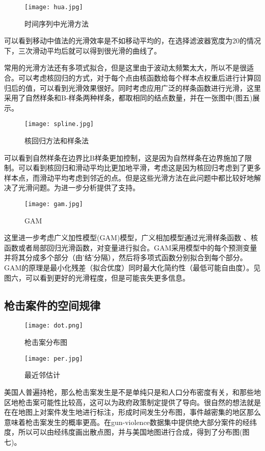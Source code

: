 \documentclass[12pt]{ctexart}
\begin{document}
\begin{figure}[!htb]
	\centering
	\texttt{[image: hua.jpg]} %
	\caption{时间序列中光滑方法} %
\end{figure}

可以看到移动中值法的光滑效率是不如移动平均的，在选择滤波器宽度为20的情况下，三次滑动平均后就可以得到很光滑的曲线了\cite{Tukey}。

常用的光滑方法还有多项式拟合，但是这里由于波动太频繁太大，所以不是很适合。可以考虑核回归的方式，对于每个点由核函数给每个样本点权重后进行计算回归后的值，可以看到光滑效果很好。同时考虑应用广泛的样条函数进行光滑，这里采用了自然样条和B-样条两种样条，都取相同的结点数量，并在一张图中(图五)展示。

\begin{figure}[!htb]
	\centering
	\texttt{[image: spline.jpg]} %
	\caption{核回归方法和样条法} %
\end{figure}
可以看到自然样条在边界比B样条更加控制，这是因为自然样条在边界施加了限制。可以看到核回归和滑动平均比更加地平滑，考虑这是因为核回归考虑到了更多样本点，而滑动平均考虑到邻近的点。但是这些光滑方法在此问题中都比较好地解决了光滑问题。为进一步分析提供了支持。
\begin{figure}[!htb]
	\centering
	\texttt{[image: gam.jpg]} %
	\caption{GAM} %
\end{figure}
这里进一步考虑广义加性模型(GAM)模型\cite{Bo}，广义相加模型通过光滑样条函数 、核函数或者局部回归光滑函数，对变量进行拟合。GAM采用模型中的每个预测变量并将其分成多个部分（由'结'​​分隔），然后将多项式函数分别拟合到每个部分。GAM的原理是最小化残差（拟合优度）同时最大化简约性（最低可能自由度）。见图六，可以看到更好的光滑程度，但是可能丧失更多信息。


\subsection{枪击案件的空间规律}
\begin{figure}[!htb]
	\centering
	\texttt{[image: dot.png]} %
	\caption{枪击案分布图} %
	
	\texttt{[image: per.jpg]} %
	\caption{最近邻估计} %
\end{figure}
美国人普遍持枪，那么枪击案发生是不是单纯只是和人口分布密度有关，和那些地区地枪击案可能性比较高，这可以为政府政策制定提供了导向。很自然的想法就是在在地图上对案件发生地进行标注，形成时间发生分布图，事件越密集的地区那么意味着枪击案发生的概率更高。在gun-violence数据集中提供绝大部分案件的经纬度，所以可以由经纬度画出散点图，并与美国地图进行合成，得到了分布图(图七)。
\end{document}
